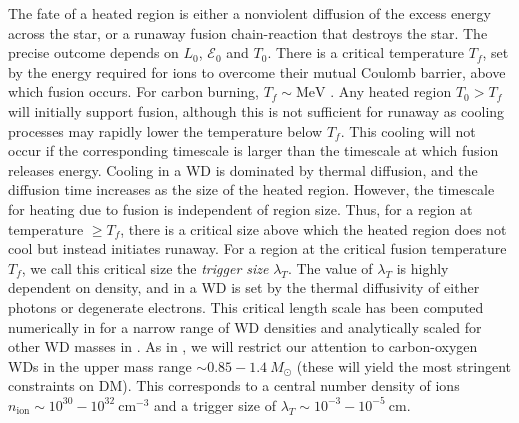 \documentclass[twocolumn, preprintnumbers,amsmath,amssymb,prd, superscriptaddress]{revtex4}
\newcommand{\Ez}{\mathcal{E}_0}
\newcommand{\MeV}{\text{MeV}}
\newcommand{\cm}{\text{cm}}
\begin{document}
The fate of a heated region is either a nonviolent diffusion of the excess energy across the star, or a runaway fusion chain-reaction that destroys the star.
The precise outcome depends on $L_0$, $\Ez$ and $T_0$.
There is a critical temperature $T_f$, set by the energy required for ions to overcome their mutual Coulomb barrier, above which fusion occurs.
For carbon burning, $T_f \sim \MeV$ \cite{Gasques:2005ar}.
Any heated region $T_0 > T_f$ will initially support fusion, although this is not sufficient for runaway as cooling processes may rapidly lower the temperature below $T_f$.
This cooling will not occur if the corresponding timescale is larger than the timescale at which fusion releases energy.
Cooling in a WD is dominated by thermal diffusion, and the diffusion time increases as the size of the heated region.
However, the timescale for heating due to fusion is independent of region size.
Thus, for a region at temperature $\geq T_f$, there is a critical size above which the heated region does not cool but instead initiates runaway.
For a region at the critical fusion temperature $T_f$, we call this critical size the \emph{trigger size} $\lambda_T$.
The value of $\lambda_T$ is highly dependent on density, and in a WD is set by the thermal diffusivity of either photons or degenerate electrons.
This critical length scale has been computed numerically in \cite{Woosley} for a narrow range of WD densities and analytically scaled for other WD masses in \cite{Graham:2015apa}.
As in \cite{Graham:2015apa}, we will restrict our attention to carbon-oxygen WDs in the upper mass range $\sim 0.85 - 1.4 ~M_{\odot}$ (these will yield the most stringent constraints on DM).
This corresponds to a central number density of ions $n_\text{ion} \sim 10^{30} - 10^{32} ~\cm^{-3}$ and a trigger size of $\lambda_T \sim 10^{-3} - 10^{-5} ~\text{cm}$.
\end{document}
